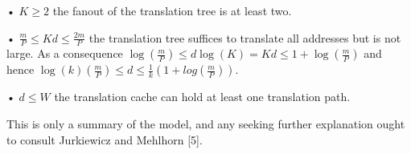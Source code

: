 • $K \geq 2$ the fanout of the translation tree is at least two.

• $\frac{m}{P}\leq Kd\leq\frac{2m}{P}$ the translation tree suffices to
translate all addresses but is not large. As a consequence 
$\log(\frac{m}{P})\leq d \log(K)=Kd\leq1+\log(\frac{m}{P})$ and hence
$\log(k)(\frac{m}{P})\leq d\leq \frac{1}{k}(1 + log(\frac{m}{P}))$.

• $d \leq W$ the translation cache can hold at least one translation path.

This is only a summary of the model, and any seeking further explanation ought
to consult Jurkiewicz and Mehlhorn [5].